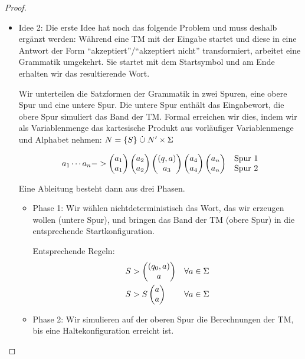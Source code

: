 {\begin{proof}
\begin{itemize}
\begin{itemize}
	
	\item Idee 2:
	Die erste Idee hat noch das folgende Problem und muss deshalb ergänzt werden:
	Während eine \ac{TM} mit der Eingabe startet und diese in eine Antwort der Form "`akzeptiert"'/"`akzeptiert nicht"' transformiert,
	arbeitet eine Grammatik umgekehrt. 
	Sie startet mit dem Startsymbol und am Ende erhalten wir das resultierende Wort.
	
	Wir unterteilen die Satzformen der Grammatik in zwei Spuren, eine obere Spur und eine untere Spur.
	Die untere Spur enthält das Eingabewort, die obere Spur simuliert das Band der \ac{TM}.
	Formal erreichen wir dies, indem wir als Variablenmenge das kartesische Produkt aus vorläufiger Variablenmenge und Alphabet nehmen:
	$N = \{S\}\mathrel{\dot\cup} N' \times\Sigma$
	
		\begin{align*}
		a_1\cdots a_n &\-->
			\pmqty{a_1\\a_1} \pmqty{a_2\\a_2} \pmqty{(q,a)\\a_3} \pmqty{a_4\\a_4} \pmqty{a_n\\a_n}
			&&\begin{matrix}\text{Spur 1}\\\text{Spur 2}\end{matrix}\\
	\end{align*}
	
	Eine Ableitung besteht dann aus drei Phasen.
	\begin{itemize}
	\item Phase 1: 
	Wir wählen nichtdeterministisch das Wort, das wir erzeugen wollen (untere Spur), und bringen das Band der \ac{TM} (obere Spur) in die entsprechende Startkonfiguration.
	
	Entsprechende Regeln:
		\begin{align*}
		S &\-> \pmqty{(q_0,a)\\a} &&\forall a\in\Sigma\\
		S &\-> S\pmqty{a\\a} &&\forall a\in\Sigma
        \end{align*}
	
	\item Phase 2:
	Wir simulieren auf der oberen Spur die Berechnungen der \ac{TM}, bis eine Haltekonfiguration erreicht ist.
	

\end{itemize}
\end{itemize}
\end{itemize}
\end{proof}}
